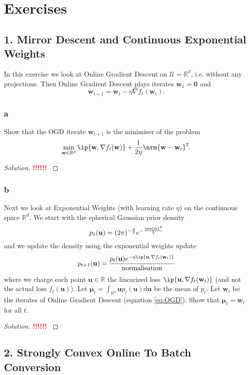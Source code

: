 \documentclass[10pt, a4paper, twoside]{amsart}
\theoremstyle{plain}
\newcommand{\R}{\ensuremath{\mathbb{R}}}
\DeclarePairedDelimiter{\ip}\langle\rangle
\DeclarePairedDelimiter{\nrm}\lVert\rVert
\newcommand{\cU}{\ensuremath{\mathcal{U}}}
\newcommand{\bw}{\ensuremath{\mathbf{w}}} %
\newcommand{\bu}{\ensuremath{\mathbf{u}}} %
\newenvironment{solution}
               {\let\oldqedsymbol=\qedsymbol
                \renewcommand{\qedsymbol}{$\blacktriangleleft$}
                \begin{proof}[Solution]}
               {\end{proof}
                \renewcommand{\qedsymbol}{\oldqedsymbol}}
\newcommand{\TODO}{\textcolor{red}{\textbf{!!!!!! }}}
\begin{document}
\section{Exercises}
\subsection*{1. Mirror Descent and Continuous Exponential Weights}
In this exercise we look at Online Gradient Descent on $\cU = \R^d$, i.e. without any projections. Then Online Gradient Descent plays iterates $\bw_1 = \mathbf{0}$ and
\begin{equation} \label{eq:OGD}
  \bw_{t+1} = \bw_t - \eta \nabla f_t (\bw_t).
\end{equation}
\subsubsection*{a}
Show that the OGD iterate $\bw_{t+1}$ is the minimiser of the problem
\begin{equation*}
  \min_{\bw \in \R^d} \ip{\bw, \nabla f_t (\bw)} + \frac{1}{2 \eta} \nrm{\bw - \bw_t}^2.
\end{equation*}
\begin{solution}
  \TODO
\end{solution}
\subsubsection*{b}
Next we look at Exponential Weights (with learning rate $\eta$) on the continuous space $\R^d$. We start with the spherical Gaussian prior density
\begin{equation*}
  p_1(\bu) = (2 \pi )^{-\frac{d}{2}} e^{- \frac{\nrm{\bu}^2}{2}}
\end{equation*}
and we update the density using the exponential weights update
\begin{equation*}
  p_{t+1}(\bu) = \frac{p_t(\bu) e^{- \eta \ip{\bu, \nabla f_t(\bw_t)}}}{\text{normalisation}}
\end{equation*}
where we charge each point $\bu \in \R$ the linearized loss $\ip{\bu, \nabla f_t(\bw_t)}$ (and not the actual loss $f_t(\bu)$). Let $\pmb{\mu}_t = \int_{\R^d} \bu p_t (\bu) \mathrm{d}\bu$ be the mean of $p_t$. Let $\bw_t$ be the iterates of Online Gradient Descent (equation \ref{eq:OGD}). Show that $\pmb{\mu}_t = \bw_t$ for all $t$.
\begin{solution}
  \TODO
\end{solution}

\subsection*{2. Strongly Convex Online To Batch Conversion}
\end{document}
